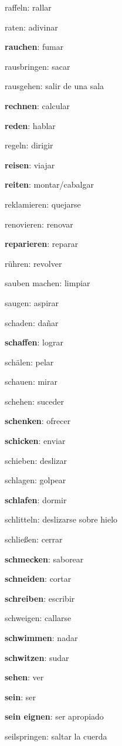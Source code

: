 \begin{multicols}{2}
\begin{myitemize}
\item raffeln: rallar
\item raten: adivinar
\item \textbf{rauchen}: fumar
\item rausbringen: sacar
\item rausgehen: salir de una sala
\item \textbf{rechnen}: calcular
\item \textbf{reden}: hablar
\item regeln: dirigir
\item \textbf{reisen}: viajar
\item \textbf{reiten}: montar/cabalgar
\item reklamieren: quejarse
\item renovieren: renovar
\item \textbf{reparieren}: reparar
\item rühren: revolver
\item sauben machen: limpiar
\item saugen: aspirar
\item schaden: dañar
\item \textbf{schaffen}: lograr
\item schälen: pelar 
\item schauen: mirar
\item schehen: suceder
\item \textbf{schenken}: ofrecer
\item \textbf{schicken}: enviar
\item schieben: deslizar
\item schlagen: golpear
\item \textbf{schlafen}: dormir
\item schlitteln: deslizarse sobre hielo
\item schließen: cerrar
\item \textbf{schmecken}: saborear
\item \textbf{schneiden}: cortar
\item \textbf{schreiben}: escribir
\item schweigen: callarse
\item \textbf{schwimmen}: nadar
\item \textbf{schwitzen}: sudar
\item \textbf{sehen}: ver
\item \textbf{sein}: ser
\item \textbf{sein eignen}: ser apropiado
\item seilspringen: saltar la cuerda

\end{myitemize}
\end{multicols}
